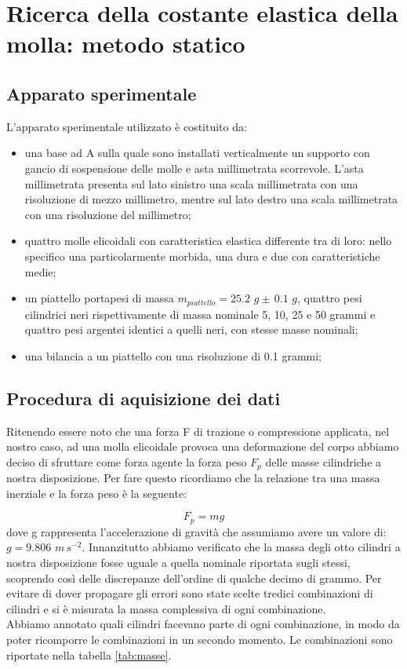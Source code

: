 \section{Ricerca della costante elastica della molla: metodo statico}

\subsection{Apparato sperimentale}
L'apparato sperimentale utilizzato è costituito da:
	\begin{itemize}
		\item{una base ad A sulla quale sono installati verticalmente un supporto con gancio di sospensione delle molle e asta millimetrata scorrevole. L'asta millimetrata presenta sul lato sinistro una scala millimetrata con una risoluzione di mezzo millimetro, mentre sul lato destro una scala millimetrata con una risoluzione del millimetro;}
		\item{quattro molle elicoidali con caratteristica elastica differente tra di loro: nello specifico una particolarmente morbida, una dura e due con caratteristiche medie;}
		\item{un piattello portapesi di massa $m_{piattello} = 25.2\,\,g \pm\, 0.1\,\,g$, quattro pesi cilindrici neri rispettivamente di massa nominale 5, 10, 25 e 50 grammi e quattro pesi argentei identici a quelli neri, con stesse masse nominali;}
		\item{una bilancia a un piattello con una risoluzione di 0.1 grammi;}
	\end{itemize}

\subsection{Procedura di aquisizione dei dati}

Ritenendo essere noto che una forza F di trazione o compressione applicata, nel nostro caso, ad una molla elicoidale provoca una deformazione del corpo abbiamo deciso di sfruttare come forza agente la forza peso $F_{p}$ delle masse cilindriche a nostra disposizione. Per fare questo ricordiamo che la relazione tra una massa inerziale e la forza peso è la seguente:

\begin{equation}
	F_{p} = mg
\end{equation}
dove g rappresenta l'accelerazione di gravità che assumiamo avere un valore di: $g = 9.806\,\,m\,s^{-2}$.
Innanzitutto abbiamo verificato che la massa degli otto cilindri a nostra disposizione fosse uguale a quella nominale riportata sugli stessi, scoprendo così delle discrepanze dell'ordine di qualche decimo di grammo. Per evitare di dover propagare gli errori sono state scelte tredici combinazioni di cilindri e si è misurata la massa complessiva di ogni combinazione.\\
Abbiamo annotato quali cilindri facevano parte di ogni combinazione, in modo da poter ricomporre le combinazioni in un secondo momento. Le combinazioni sono riportate nella tabella \ref{tab:masse}.

